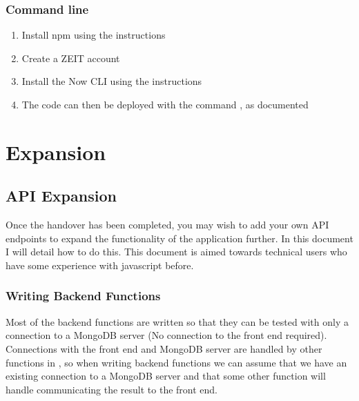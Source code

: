 \documentclass[letterpaper,10pt,english]{sphinxmanual}
\let\oldsubsection\subsection
\renewcommand{\subsection}{\needspace{6\baselineskip}\oldsubsection}
\begin{document}
\subsection{Command line}
\label{\detokenize{docs/Installation/frontEnd:command-line}}\begin{enumerate}
%
\item {} 
Install npm using the instructions

\item {} 
Create a ZEIT account 

\item {} 
Install the Now CLI using the instructions

\item {} 
The code can then be deployed with the command , as documented

\end{enumerate}


\chapter{Expansion}
\label{\detokenize{index:expansion}}

\section{API Expansion}
\label{\detokenize{docs/Expansion/api-expansion:api-expansion}}\label{\detokenize{docs/Expansion/api-expansion::doc}}
Once the handover has been completed, you may wish to add your own API
endpoints to expand the functionality of the application further. In
this document I will detail how to do this. This document is aimed
towards technical users who have some experience with javascript before.


\subsection{Writing Back\sphinxhyphen{}end Functions}
\label{\detokenize{docs/Expansion/api-expansion:writing-back-end-functions}}
Most of the back\sphinxhyphen{}end functions are written so that they can be tested
with only a connection to a MongoDB server (No connection to the front
end required). Connections with the front end and MongoDB server are
handled by other functions in , so when writing
back\sphinxhyphen{}end functions we can assume that we have an existing connection to
a MongoDB server and that some other function will handle communicating
the result to the front end.
\end{document}
